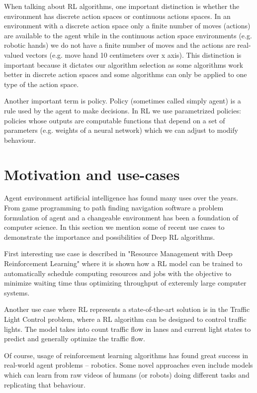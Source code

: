 \documentclass[b5paper]{book}
\begin{document}
When talking about RL algorithms, one important distinction is whether the environment has discrete action spaces or continuous actions spaces. In an environment with a discrete action space only a finite number of moves (actions) are available to the agent while in the continuous action space environments (e.g. robotic hands) we do not have a finite number of moves and the actions are real-valued vectors (e.g. move hand 10 centimeters over x axis). This distinction is important because it dictates our algorithm selection as some algorithms work better in discrete action spaces and some algorithms can only be applied to one type of the action space.

Another important term is policy. Policy (sometimes called simply agent) is a rule used by the agent to make decisions. In RL we use parametrized policies: policies whose outputs are computable functions that depend on a set of parameters (e.g. weights of a neural network) which we can adjust to modify behaviour. 


\section{Motivation and use-cases} 


Agent environment artificial intelligence has found many uses over the years. From game programming to path finding navigation software a problem formulation of agent and a changeable environment has been a foundation of computer science. In this section we mention some of recent use cases to demonstrate the importance and possibilities of Deep RL algorithms.

First interesting use case is described in "Resource Management with Deep Reinforcement Learning" where it is shown how a RL model can be trained to automatically schedule computing resources and jobs with the objective to minimize waiting time thus optimizing throughput of exteremly large computer systems.

Another use case where RL represents a state-of-the-art solution is in the Traffic Light Control problem, where a RL algorithm can be designed to control traffic lights. The model takes into count traffic flow in lanes and current light states to predict and generally optimize the traffic flow.

Of course, usage of reinforcement learning algorithms has found great success in real-world agent problems -- robotics. Some novel approaches even include models which can learn from raw videos of humans (or robots) doing different tasks and replicating that behaviour.
\end{document}
